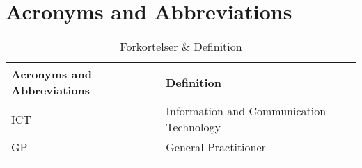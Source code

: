 \chapter{Acronyms and Abbreviations}


\begin{longtabu} to 
	\textbf{Acronyms and Abbreviations} & \textbf{Definition}\\[-1ex]
	\midrule
	ICT & Information and Communication Technology \\[-1ex]
	GP & General Practitioner \\[-1ex]
	\caption{Forkortelser \& Definition}
\end{longtabu}